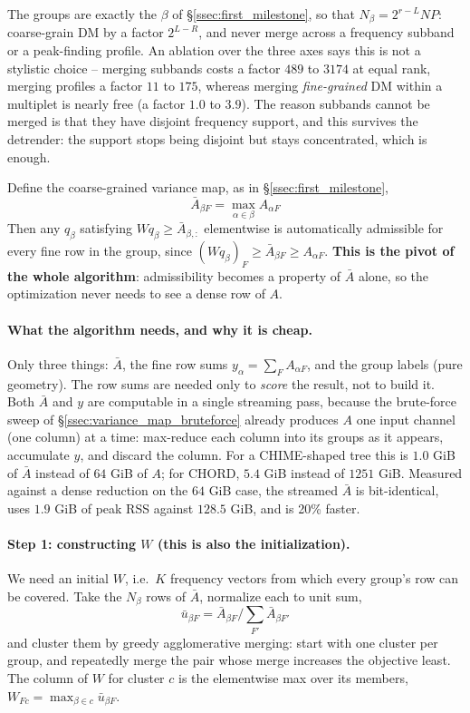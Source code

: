 \documentclass{article}
\numberwithin{equation}{section}   %
\begin{document}
The groups are exactly the $\beta$ of \S\ref{ssec:first_milestone}, so that
$N_\beta = 2^{r-L}NP$: coarse-grain DM by a factor
$2^{L-R}$, and never merge across a frequency subband or a peak-finding profile. An ablation
over the three axes says this is not a stylistic choice -- merging subbands costs a factor
$489$ to $3174$ at equal rank, merging profiles a factor $11$ to $175$, whereas merging
{\em fine-grained} DM within a multiplet is nearly free (a factor $1.0$ to $3.9$). The reason
subbands cannot be merged is that they have disjoint frequency support, and this survives the
detrender: the support stops being disjoint but stays concentrated, which is enough.

Define the coarse-grained variance map, as in \S\ref{ssec:first_milestone},
\begin{equation}
\bar A_{\beta F} = \max_{\alpha \in \beta} A_{\alpha F}
\label{eq:varmap_abar}
\end{equation}
Then any $q_\beta$ satisfying $W q_\beta \ge \bar A_{\beta,:}$ elementwise is automatically
admissible for every fine row in the group, since $(Wq_\beta)_F \ge \bar A_{\beta F} \ge
A_{\alpha F}$. {\bf This is the pivot of the whole algorithm}: admissibility becomes a property
of $\bar A$ alone, so the optimization never needs to see a dense row of $A$.

\paragraph*{What the algorithm needs, and why it is cheap.}
Only three things: $\bar A$, the fine row sums $y_\alpha = \sum_F A_{\alpha F}$, and the group
labels (pure geometry). The row sums are needed only to {\em score} the result, not to build it.
Both $\bar A$ and $y$ are computable in a single streaming pass, because the brute-force sweep
of \S\ref{ssec:variance_map_bruteforce} already produces $A$ one input channel (one column) at a
time: max-reduce each column into its groups as it appears, accumulate $y$, and discard the
column. For a CHIME-shaped tree this is $1.0$ GiB of $\bar A$ instead of $64$ GiB of $A$; for
CHORD, $5.4$ GiB instead of $1251$ GiB. Measured against a dense reduction on the $64$ GiB case,
the streamed $\bar A$ is bit-identical, uses $1.9$ GiB of peak RSS against $128.5$ GiB, and is
20\% faster.

\paragraph*{Step 1: constructing $W$ (this is also the initialization).}
We need an initial $W$, i.e.\ $K$ frequency vectors from which every group's row can be covered.
Take the $N_\beta$ rows of $\bar A$, normalize each to unit sum,
\begin{equation}
\bar u_{\beta F} = \bar A_{\beta F} \Big/ \sum_{F'} \bar A_{\beta F'}
\end{equation}
and cluster them by greedy agglomerative merging: start with one cluster per group, and
repeatedly merge the pair whose merge increases the objective least. The column of $W$ for
cluster $c$ is the elementwise max over its members, $W_{Fc} = \max_{\beta \in c} \bar
u_{\beta F}$.
\end{document}
